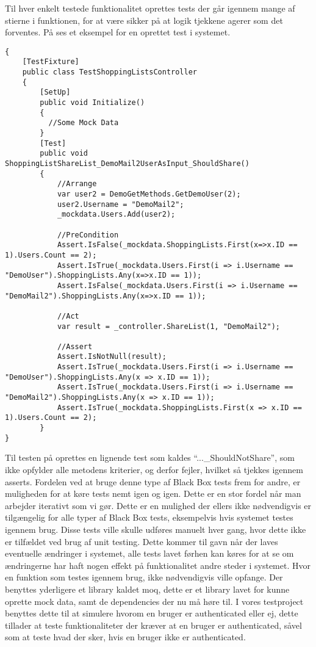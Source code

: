 Til hver enkelt testede funktionalitet oprettes tests der går igennem mange af stierne i funktionen, for at være sikker på at logik tjekkene agerer som det forventes.
På  ses et eksempel for en oprettet test i systemet.

\begin{lstlisting}[caption="En test for ``ShareList'' metoden i ``ShoppingListController''\, heri tjekkes hvorom den User listen deles med\, får listen sat ind på sin liste over ShoppingLists\, samt at ShoppingListen får tilføjet endnu en user.", label=lsttest]
{
    [TestFixture]
    public class TestShoppingListsController
    {
		[SetUp]
        public void Initialize()
        {
          //Some Mock Data
        }
        [Test]
        public void ShoppingListShareList_DemoMail2UserAsInput_ShouldShare()
        {
            //Arrange
            var user2 = DemoGetMethods.GetDemoUser(2);
            user2.Username = "DemoMail2";
            _mockdata.Users.Add(user2); 

            //PreCondition
            Assert.IsFalse(_mockdata.ShoppingLists.First(x=>x.ID == 1).Users.Count == 2);
            Assert.IsTrue(_mockdata.Users.First(i => i.Username == "DemoUser").ShoppingLists.Any(x=>x.ID == 1));
            Assert.IsFalse(_mockdata.Users.First(i => i.Username == "DemoMail2").ShoppingLists.Any(x=>x.ID == 1));

            //Act
            var result = _controller.ShareList(1, "DemoMail2");

            //Assert
            Assert.IsNotNull(result);
            Assert.IsTrue(_mockdata.Users.First(i => i.Username == "DemoUser").ShoppingLists.Any(x => x.ID == 1));
            Assert.IsTrue(_mockdata.Users.First(i => i.Username == "DemoMail2").ShoppingLists.Any(x => x.ID == 1));
            Assert.IsTrue(_mockdata.ShoppingLists.First(x => x.ID == 1).Users.Count == 2);
        }
}        
\end{lstlisting}\label{lsttest}
Til testen på  oprettes en lignende test som kaldes ``...\_ShouldNotShare'', som ikke opfylder alle metodens kriterier, og derfor fejler, hvilket så tjekkes igennem asserts.
Fordelen ved at bruge denne type af Black Box tests frem for andre, er muligheden for at køre tests nemt igen og igen.
Dette er en stor fordel når man arbejder iterativt som vi gør.
Dette er en mulighed der ellers ikke nødvendigvis er tilgængelig for alle typer af Black Box tests, eksempelvis hvis systemet testes igennem brug.
Disse tests ville skulle udføres manuelt hver gang, hvor dette ikke er tilfældet ved brug af unit testing.
Dette kommer til gavn når der laves eventuelle ændringer i systemet, alle tests lavet førhen kan køres for at se om ændringerne har haft nogen effekt på funktionalitet andre steder i systemet. 
Hvor en funktion som testes igennem brug, ikke nødvendigvis ville opfange.
Der benyttes yderligere et library kaldet moq, dette er et library lavet for kunne oprette mock data, samt de dependencies der nu må høre til.
I vores testproject benyttes dette til at simulere hvorom en bruger er authenticated eller ej, dette tillader at teste funktionaliteter der kræver at en bruger er authenticated, såvel som at teste hvad der sker, hvis en bruger ikke er authenticated.

